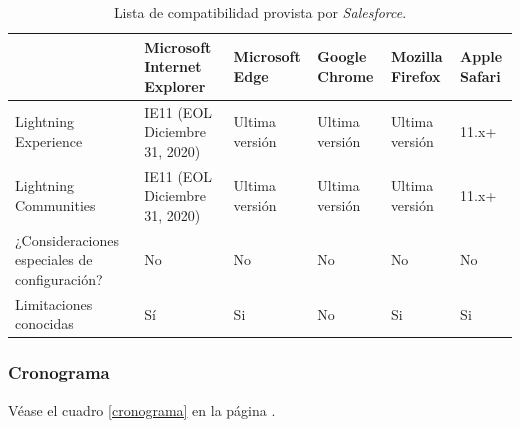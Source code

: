 \begin{table}
\centering
\begin{tabular}{|p{6.0cm}|p{2.5cm}|p{1.4cm}|p{1.3cm}|p{1.3cm}|p{1.0cm}|}
\hline
& \footnotesize{\textbf{Microsoft Internet Explorer}} & \footnotesize{\textbf{Microsoft Edge}} & \footnotesize{\textbf{Google Chrome}} & \footnotesize{\textbf{Mozilla Firefox}} & \footnotesize{\textbf{Apple Safari}} \\
\hline
\footnotesize{Lightning Experience} & \footnotesize{IE11 (EOL Diciembre 31, 2020)} & \footnotesize{Ultima versión} & \footnotesize{Ultima versión} & \footnotesize{Ultima versión} & \footnotesize{11.x+} \\
\footnotesize{Lightning Communities} & \footnotesize{IE11 (EOL Diciembre 31, 2020)} & \footnotesize{Ultima versión} & \footnotesize{Ultima versión} & \footnotesize{Ultima versión} & \footnotesize{11.x+} \\
\footnotesize{¿Consideraciones especiales de configuración?} & \footnotesize{No} & \footnotesize{No} & \footnotesize{No} & \footnotesize{No} & \footnotesize{No} \\
\footnotesize{Limitaciones conocidas} & \footnotesize{Sí} & \footnotesize{Si} & \footnotesize{No} & \footnotesize{Si} & \footnotesize{Si} \\
\hline
\end{tabular}
\caption{Lista de compatibilidad provista por \emph{Salesforce}.}
\label{soporte_navegadores}
\end{table}

\subsubsection{Cronograma}
Véase el cuadro \ref{cronograma} en la página \pageref{cronograma}.

